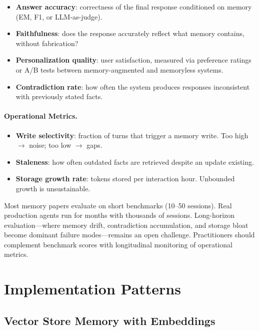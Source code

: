 \begin{itemize}
  \item \textbf{Answer accuracy}: correctness of the final response conditioned on memory (EM, F1, or LLM-as-judge).
  \item \textbf{Faithfulness}: does the response accurately reflect what memory contains, without fabrication?
  \item \textbf{Personalization quality}: user satisfaction, measured via preference ratings or A/B tests between memory-augmented and memoryless systems.
  \item \textbf{Contradiction rate}: how often the system produces responses inconsistent with previously stated facts.
\end{itemize}

\paragraph{Operational Metrics.}
\label{operational-metrics.}

\begin{itemize}
  \item \textbf{Write selectivity}: fraction of turns that trigger a memory write. Too high $\to$ noise; too low $\to$ gaps.
  \item \textbf{Staleness}: how often outdated facts are retrieved despite an update existing.
  \item \textbf{Storage growth rate}: tokens stored per interaction hour. Unbounded growth is unsustainable.
\end{itemize}

\begin{warningbox}
Most memory papers evaluate on short benchmarks (10--50 sessions). Real production agents run for months with thousands of sessions. Long-horizon evaluation---where memory drift, contradiction accumulation, and storage bloat become dominant failure modes---remains an open challenge. Practitioners should complement benchmark scores with longitudinal monitoring of operational metrics.
\end{warningbox}

\section{Implementation Patterns}
\label{sec:memory-implementation}

\subsection{Vector Store Memory with Embeddings}
\label{vector-store-memory-with-embeddings}

